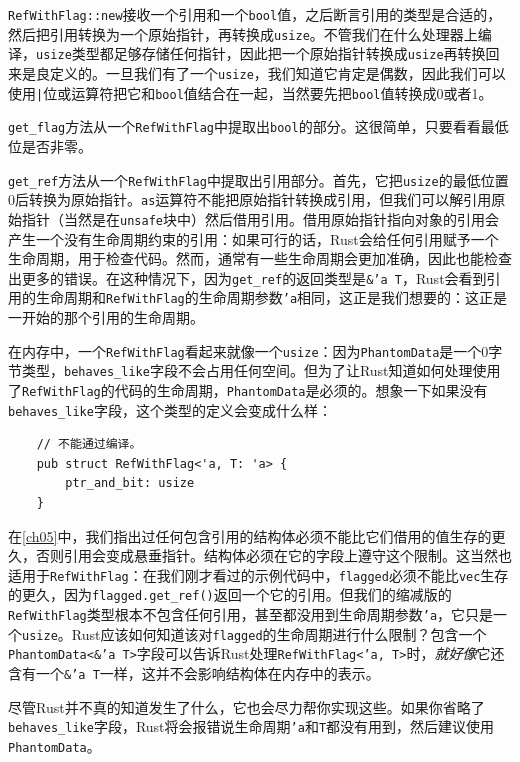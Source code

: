 \texttt{RefWithFlag::new}接收一个引用和一个\texttt{bool}值，之后断言引用的类型是合适的，然后把引用转换为一个原始指针，再转换成\texttt{usize}。不管我们在什么处理器上编译，\texttt{usize}类型都足够存储任何指针，因此把一个原始指针转换成\texttt{usize}再转换回来是良定义的。一旦我们有了一个\texttt{usize}，我们知道它肯定是偶数，因此我们可以使用\texttt{|}位或运算符把它和\texttt{bool}值结合在一起，当然要先把\texttt{bool}值转换成0或者1。

\texttt{get\_flag}方法从一个\texttt{RefWithFlag}中提取出\texttt{bool}的部分。这很简单，只要看看最低位是否非零。

\texttt{get\_ref}方法从一个\texttt{RefWithFlag}中提取出引用部分。首先，它把\texttt{usize}的最低位置0后转换为原始指针。\texttt{as}运算符不能把原始指针转换成引用，但我们可以解引用原始指针（当然是在\texttt{unsafe}块中）然后借用引用。借用原始指针指向对象的引用会产生一个没有生命周期约束的引用：如果可行的话，Rust会给任何引用赋予一个生命周期，用于检查代码。然而，通常有一些生命周期会更加准确，因此也能检查出更多的错误。在这种情况下，因为\texttt{get\_ref}的返回类型是\texttt{\&'a T}，Rust会看到引用的生命周期和\texttt{RefWithFlag}的生命周期参数\texttt{'a}相同，这正是我们想要的：这正是一开始的那个引用的生命周期。

在内存中，一个\texttt{RefWithFlag}看起来就像一个\texttt{usize}：因为\texttt{PhantomData}是一个0字节类型，\texttt{behaves\_like}字段不会占用任何空间。但为了让Rust知道如何处理使用了\texttt{RefWithFlag}的代码的生命周期，\texttt{PhantomData}是必须的。想象一下如果没有\texttt{behaves\_like}字段，这个类型的定义会变成什么样：
\begin{verbatim}
    // 不能通过编译。
    pub struct RefWithFlag<'a, T: 'a> {
        ptr_and_bit: usize
    }
\end{verbatim}

在\autoref{ch05}中，我们指出过任何包含引用的结构体必须不能比它们借用的值生存的更久，否则引用会变成悬垂指针。结构体必须在它的字段上遵守这个限制。这当然也适用于\texttt{RefWithFlag}：在我们刚才看过的示例代码中，\texttt{flagged}必须不能比\texttt{vec}生存的更久，因为\texttt{flagged.get\_ref()}返回一个它的引用。但我们的缩减版的\texttt{RefWithFlag}类型根本不包含任何引用，甚至都没用到生命周期参数\texttt{'a}，它只是一个\texttt{usize}。Rust应该如何知道该对\texttt{flagged}的生命周期进行什么限制？包含一个\texttt{PhantomData<\&'a T>}字段可以告诉Rust处理\texttt{RefWithFlag<'a, T>}时，\emph{就好像}它还含有一个\texttt{\&'a T}一样，这并不会影响结构体在内存中的表示。

尽管Rust并不真的知道发生了什么，它也会尽力帮你实现这些。如果你省略了\texttt{behaves\_like}字段，Rust将会报错说生命周期\texttt{'a}和\texttt{T}都没有用到，然后建议使用\texttt{PhantomData}。

